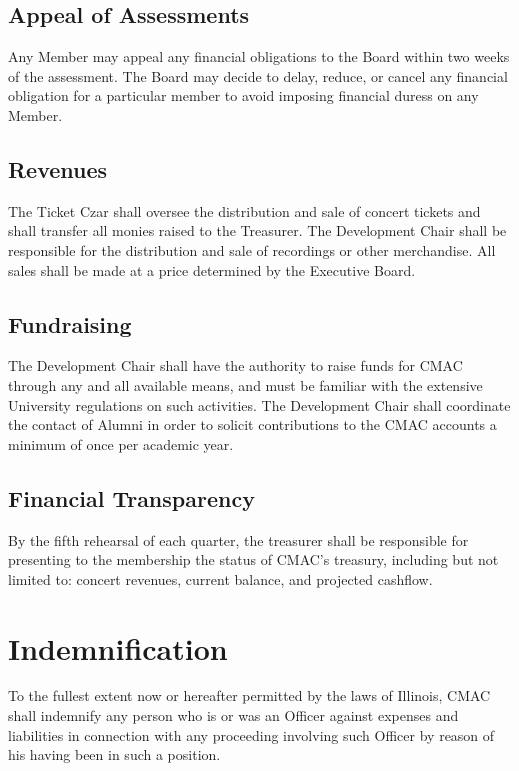 \documentclass{article}
\begin{document}
\subsection{Appeal of Assessments}

Any Member may appeal any financial obligations to the Board within two weeks of
the assessment. The Board may decide to delay, reduce, or cancel any financial
obligation for a particular member to avoid imposing financial duress on any
Member.

\subsection{Revenues}

The Ticket Czar shall oversee the distribution and sale of concert
tickets and shall transfer all monies raised to the Treasurer. The
Development Chair shall be responsible for the distribution and sale
of recordings or other merchandise. All sales shall be made at a price
determined by the Executive Board.

\subsection{Fundraising}

The Development Chair shall have the authority to raise funds for CMAC through
any and all available means, and must be familiar with the extensive University
regulations on such activities. The Development Chair shall coordinate the
contact of Alumni in order to solicit contributions to the CMAC accounts a
minimum of once per academic year.

\subsection{Financial Transparency}

By the fifth rehearsal of each quarter, the treasurer shall be responsible
for presenting to the membership the status of CMAC's treasury, including
but not limited to: concert revenues, current balance, and projected
cashflow.

\section{Indemnification}

To the fullest extent now or hereafter permitted by the laws of Illinois,
CMAC shall indemnify any person who is or was an Officer against expenses
and liabilities in connection with any proceeding involving such Officer
by reason of his having been in such a position.
\end{document}
